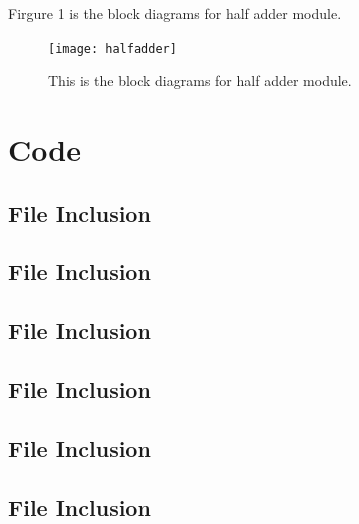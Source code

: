 \documentclass[11pt]{article}
\newcommand{\Verilog}[2][]{%
	
}
\begin{document}
	
	Firgure 1 is the block diagrams for half adder module. \\
	\begin{figure}[ht]\centering    
		\texttt{[image: halfadder]}    
		\caption{This is the block diagrams for half adder module.}    
		\label{fig:halfadder}
	\end{figure}



\section*{Code}

\subsection*{File Inclusion}
\Verilog[caption=Half Adder Verilog code,label=code:file_ex]{halfadder.sv}

\subsection*{File Inclusion}
\Verilog[caption=Half Adder Test Benches Verilog code,label=code:file_ex]{halfadder_test.sv}

\subsection*{File Inclusion}
\Verilog[caption=Full Adder Verilog code,label=code:file_ex]{fulladder.sv}

\subsection*{File Inclusion}
\Verilog[caption=Full Adder Test Benches Verilog code,label=code:file_ex]{fulladder_test.sv}

\subsection*{File Inclusion}
\Verilog[caption=Two Bit Adder/Aubtractor Verilog code,label=code:file_ex]{addsub.sv}

\subsection*{File Inclusion}
\Verilog[caption=Two Bit Adder/Aubtractor Test Benches Verilog code,label=code:file_ex]{addsub_test.sv}
\end{document}
